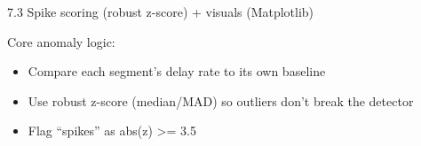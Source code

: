 \documentclass[11pt]{article}
\providecommand{\tightlist}{%
      \setlength{\itemsep}{0pt}\setlength{\parskip}{0pt}}
\begin{document}
    \begin{Verbatim}[commandchars=\\\{\}]

    \end{Verbatim}

    7.3 Spike scoring (robust z-score) + visuals (Matplotlib)

Core anomaly logic:

\begin{itemize}
\tightlist
\item
  Compare each segment's delay rate to its own baseline
\item
  Use robust z-score (median/MAD) so outliers don't break the detector
\item
  Flag ``spikes'' as abs(z) \textgreater= 3.5
\end{itemize}
\end{document}
